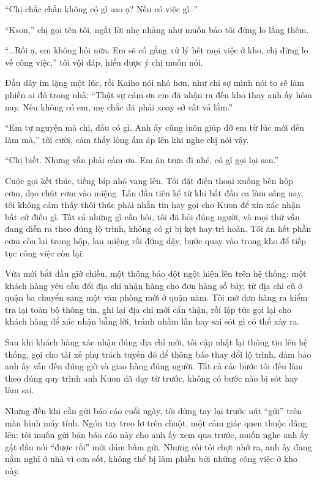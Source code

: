 \documentclass[../main.tex]{subfiles}
\begin{document}
``Chị chắc chắn không có gì sao ạ? Nếu có việc gì--''

``Kson,'' chị gọi tên tôi, ngắt lời nhẹ nhàng như muốn bảo tôi đừng lo lắng thêm.

``\dots Rồi ạ, em không hỏi nữa. Em sẽ cố gắng xử lý hết mọi việc ở kho, chị đừng lo về công việc,'' tôi vội đáp, hiểu được ý chị muốn nói.

Đầu dây im lặng một lúc, rồi Kaiho nói nhỏ hơn, như chỉ sợ mình nói to sẽ làm phiền ai đó trong nhà: ``Thật sự cảm ơn em đã nhận ra đến kho thay anh ấy hôm nay. Nếu không có em, mẹ chắc đã phải xoay sở vất vả lắm.''

``Em tự nguyện mà chị, đâu có gì. Anh ấy cũng luôn giúp đỡ em từ lúc mới đến làm mà,'' tôi cười, cảm thấy lòng ấm áp lên khi nghe chị nói vậy.

``Chị biết. Nhưng vẫn phải cảm ơn. Em ăn trưa đi nhé, có gì gọi lại sau.''

Cuộc gọi kết thúc, tiếng bíp nhỏ vang lên. Tôi đặt điện thoại xuống bên hộp cơm, dạo chút cơm vào miệng. Lần đầu tiên kể từ khi bắt đầu ca làm sáng nay, tôi không cảm thấy thôi thúc phải nhắn tin hay gọi cho Kuon để xin xác nhận bất cứ điều gì. Tất cả những gì cần hỏi, tôi đã hỏi đúng người, và mọi thứ vẫn đang diễn ra theo đúng lộ trình, không có gì bị kẹt hay trì hoãn. Tôi ăn hết phần cơm còn lại trong hộp, lau miệng rồi đứng dậy, bước quay vào trong kho để tiếp tục công việc còn lại.

\ct

Vừa mới bắt đầu giờ chiều, một thông báo đột ngột hiện lên trên hệ thống: một khách hàng yêu cầu đổi địa chỉ nhận hàng cho đơn hàng số bảy, từ địa chỉ cũ ở quận ba chuyển sang một văn phòng mới ở quận năm. Tôi mở đơn hàng ra kiểm tra lại toàn bộ thông tin, ghi lại địa chỉ mới cẩn thận, rồi lập tức gọi lại cho khách hàng để xác nhận bằng lời, tránh nhầm lẫn hay sai sót gì có thể xảy ra. 

Sau khi khách hàng xác nhận đúng địa chỉ mới, tôi cập nhật lại thông tin lên hệ thống, gọi cho tài xế phụ trách tuyến đó để thông báo thay đổi lộ trình, đảm bảo anh ấy vẫn đến đúng giờ và giao hàng đúng người. Tất cả các bước tôi đều làm theo đúng quy trình anh Kuon đã dạy từ trước, không có bước nào bị sót hay làm sai.

Nhưng đến khi cần gửi báo cáo cuối ngày, tôi dừng tay lại trước nút ``gửi'' trên màn hình máy tính. Ngón tay treo lơ trên chuột, một cảm giác quen thuộc dâng lên: tôi muốn gửi bản báo cáo này cho anh ấy xem qua trước, muốn nghe anh ấy gật đầu nói ``được rồi'' mới dám bấm gửi. Nhưng rồi tôi chợt nhớ ra, anh ấy đang nằm nghỉ ở nhà vì cơn sốt, không thể bị làm phiền bởi những công việc ở kho này.
\end{document}

